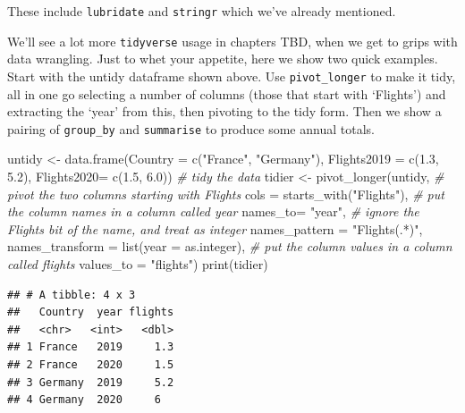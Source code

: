\documentclass[
]{book}
\newenvironment{Shaded}{\begin{snugshade}}{\end{snugshade}}
\newcommand{\AttributeTok}[1]{\textcolor[rgb]{0.77,0.63,0.00}{#1}}
\newcommand{\CommentTok}[1]{\textcolor[rgb]{0.56,0.35,0.01}{\textit{#1}}}
\newcommand{\FloatTok}[1]{\textcolor[rgb]{0.00,0.00,0.81}{#1}}
\newcommand{\FunctionTok}[1]{\textcolor[rgb]{0.00,0.00,0.00}{#1}}
\newcommand{\NormalTok}[1]{#1}
\newcommand{\OtherTok}[1]{\textcolor[rgb]{0.56,0.35,0.01}{#1}}
\newcommand{\StringTok}[1]{\textcolor[rgb]{0.31,0.60,0.02}{#1}}
\begin{document}
These include \texttt{lubridate} and \texttt{stringr} which we've already mentioned.

We'll see a lot more \texttt{tidyverse} usage in chapters TBD, when we get to grips with data wrangling. Just to whet your appetite, here we show two quick examples. Start with the untidy dataframe shown above. Use \texttt{pivot\_longer} to make it tidy, all in one go selecting a number of columns (those that start with `Flights') and extracting the `year' from this, then pivoting to the tidy form. Then we show a pairing of \texttt{group\_by} and \texttt{summarise} to produce some annual totals.

\begin{Shaded}
\begin{Highlighting}[]
\NormalTok{untidy }\OtherTok{\textless{}{-}} \FunctionTok{data.frame}\NormalTok{(}\AttributeTok{Country =} \FunctionTok{c}\NormalTok{(}\StringTok{"France"}\NormalTok{, }\StringTok{"Germany"}\NormalTok{), }
                     \AttributeTok{Flights2019 =} \FunctionTok{c}\NormalTok{(}\FloatTok{1.3}\NormalTok{, }\FloatTok{5.2}\NormalTok{), }
                     \AttributeTok{Flights2020=} \FunctionTok{c}\NormalTok{(}\FloatTok{1.5}\NormalTok{, }\FloatTok{6.0}\NormalTok{))}
\CommentTok{\# tidy the data}
\NormalTok{tidier }\OtherTok{\textless{}{-}} \FunctionTok{pivot\_longer}\NormalTok{(untidy, }
                       \CommentTok{\# pivot the two columns starting with \textquotesingle{}Flights\textquotesingle{}}
                       \AttributeTok{cols =} \FunctionTok{starts\_with}\NormalTok{(}\StringTok{"Flights"}\NormalTok{),}
                       \CommentTok{\# put the column names in a column called \textquotesingle{}year\textquotesingle{}}
                       \AttributeTok{names\_to=} \StringTok{"year"}\NormalTok{,}
                       \CommentTok{\# ignore the \textquotesingle{}Flights\textquotesingle{} bit of the name, and treat as integer}
                       \AttributeTok{names\_pattern =} \StringTok{"Flights(.*)"}\NormalTok{,}
                       \AttributeTok{names\_transform =} \FunctionTok{list}\NormalTok{(}\AttributeTok{year =}\NormalTok{ as.integer),}
                       \CommentTok{\# put the column values in a column called \textquotesingle{}flights\textquotesingle{}}
                       \AttributeTok{values\_to =} \StringTok{"flights"}\NormalTok{)}
\FunctionTok{print}\NormalTok{(tidier)}
\end{Highlighting}
\end{Shaded}

\begin{verbatim}
## # A tibble: 4 x 3
##   Country  year flights
##   <chr>   <int>   <dbl>
## 1 France   2019     1.3
## 2 France   2020     1.5
## 3 Germany  2019     5.2
## 4 Germany  2020     6
\end{verbatim}
\end{document}
